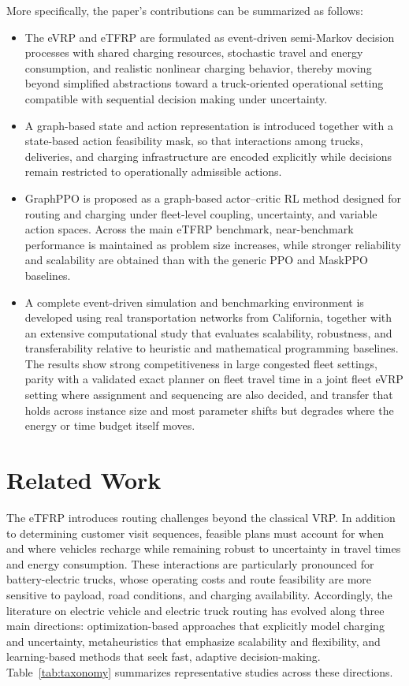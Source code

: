 \documentclass[a4paper,fleqn]{cas-sc}
\begin{document}
More specifically, the paper's contributions can be summarized as follows:
\begin{itemize}
    \item The eVRP and eTFRP are formulated as event-driven semi-Markov decision processes with shared charging resources, stochastic travel and energy consumption, and realistic nonlinear charging behavior, thereby moving beyond simplified abstractions toward a truck-oriented operational setting compatible with sequential decision making under uncertainty.

    \item A graph-based state and action representation is introduced together with a state-based action feasibility mask, so that interactions among trucks, deliveries, and charging infrastructure are encoded explicitly while decisions remain restricted to operationally admissible actions.

    \item GraphPPO is proposed as a graph-based actor--critic RL method designed for routing and charging under fleet-level coupling, uncertainty, and variable action spaces. Across the main eTFRP benchmark, near-benchmark performance is maintained as problem size increases, while stronger reliability and scalability are obtained than with the generic PPO and MaskPPO baselines.

    \item A complete event-driven simulation and benchmarking environment is developed using real transportation networks from California, together with an extensive computational study that evaluates scalability, robustness, and transferability relative to heuristic and mathematical programming baselines. The results show strong competitiveness in large congested fleet settings, parity with a validated exact planner on fleet travel time in a joint fleet eVRP setting where assignment and sequencing are also decided, and transfer that holds across instance size and most parameter shifts but degrades where the energy or time budget itself moves.
\end{itemize}



\section{Related Work}

The eTFRP introduces routing challenges beyond the classical VRP. In addition to determining customer visit sequences, feasible plans must account for when and where vehicles recharge while remaining robust to uncertainty in travel times and energy consumption. These interactions are particularly pronounced for battery-electric trucks, whose operating costs and route feasibility are more sensitive to payload, road conditions, and charging availability. Accordingly, the literature on electric vehicle and electric truck routing has evolved along three main directions: optimization-based approaches that explicitly model charging and uncertainty, metaheuristics that emphasize scalability and flexibility, and learning-based methods that seek fast, adaptive decision-making. Table~\ref{tab:taxonomy} summarizes representative studies across these directions. 
\end{document}
